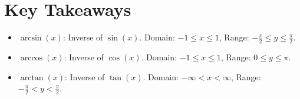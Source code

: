 \documentclass{article}
\begin{document}
\section*{Key Takeaways}
\begin{definitionbox}
\begin{itemize}
    \item $\arcsin(x)$: Inverse of $\sin(x)$. Domain: $-1 \leq x \leq 1$, Range: $-\frac{\pi}{2} \leq y \leq \frac{\pi}{2}$.
    \item $\arccos(x)$: Inverse of $\cos(x)$. Domain: $-1 \leq x \leq 1$, Range: $0 \leq y \leq \pi$.
    \item $\arctan(x)$: Inverse of $\tan(x)$. Domain: $-\infty < x < \infty$, Range: $-\frac{\pi}{2} < y < \frac{\pi}{2}$.
\end{itemize}
\end{definitionbox}
\end{document}
